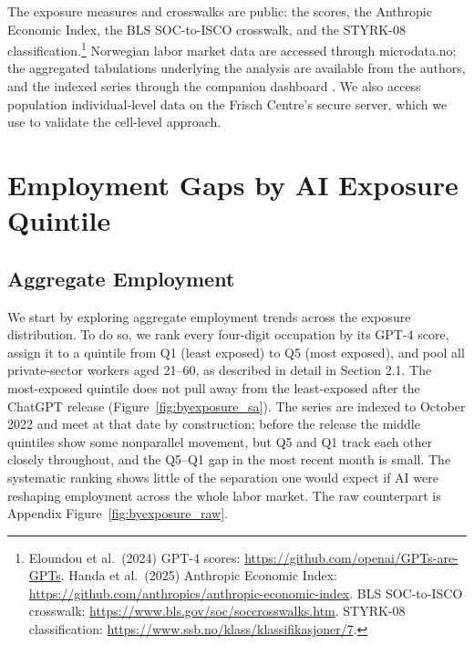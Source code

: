 \documentclass[12pt]{article}
\begin{document}
The exposure measures and crosswalks are public: the \citet{eloundou2024} scores, the \citet{handa2025} Anthropic Economic Index, the BLS SOC-to-ISCO crosswalk, and the STYRK-08 classification.\footnote{Eloundou et al.\ (2024) GPT-4 scores: \url{https://github.com/openai/GPTs-are-GPTs}. Handa et al.\ (2025) Anthropic Economic Index: \url{https://github.com/anthropics/anthropic-economic-index}. BLS SOC-to-ISCO crosswalk: \url{https://www.bls.gov/soc/soccrosswalks.htm}. STYRK-08 classification: \url{https://www.ssb.no/klass/klassifikasjoner/7}.} Norwegian labor market data are accessed through microdata.no; the aggregated tabulations underlying the analysis are available from the authors, and the indexed series through the companion dashboard \citep{kiindeksen2026}. We also access population individual-level data on the Frisch Centre's secure server, which we use to validate the cell-level approach.




\section{Employment Gaps by AI Exposure Quintile}\label{sec:results}

\subsection{Aggregate Employment}\label{sec:results:quintiles}

We start by exploring aggregate employment trends across the exposure distribution. To do so, we rank every four-digit occupation by its \citet{eloundou2024} GPT-4 score, assign it to a quintile from Q1 (least exposed) to Q5 (most exposed), and pool all private-sector workers aged 21--60, as described in detail in Section 2.1. The most-exposed quintile does not pull away from the least-exposed after the ChatGPT release (Figure~\ref{fig:byexposure_sa}). The series are indexed to October 2022 and meet at that date by construction; before the release the middle quintiles show some nonparallel movement, but Q5 and Q1 track each other closely throughout, and the Q5--Q1 gap in the most recent month is small. The systematic ranking shows little of the separation one would expect if AI were reshaping employment across the whole labor market. The raw counterpart is Appendix Figure~\ref{fig:byexposure_raw}.
\end{document}
